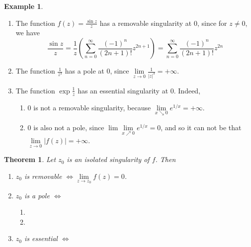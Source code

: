 \documentclass[12pt,openany]{book}
\newtheorem{theorem}{Theorem}[chapter]
\theoremstyle{definition}
\newtheorem{example}{Example}[section]
\newcommand{\of}[1]{\left( #1 \right)}
\newcommand{\abs}[1]{\left\lvert #1 \right\rvert}
\begin{document}
	\begin{example}
		\ \begin{enumerate}[(1)]
			\item The function $f(z)=\displaystyle\frac{\sin z}{z}$ has a removable singularity at $0$, since for $z\neq 0$, we have \[
			\frac{\sin z}{z}=\frac{1}{z}\of{\sum_{n=0}^\infty\frac{(-1)^n}{(2n+1)!}z^{2n+1}}=\sum_{n=0}^\infty\frac{(-1)^n}{(2n+1)!}z^{2n}
			\]
			\item The function $\displaystyle\frac{1}{z^3}$ has a pole at $0$, since $\displaystyle\lim\limits_{z\to 0}\frac{1}{\abs{z}^3}=+\infty$.
			\item The function $\exp\displaystyle\frac{1}{z}$ has an essential singularity at $0$. Indeed, \begin{enumerate}
				\item $0$ is not a removable singularity, because $\lim\limits_{x\searrow 0}e^{1/x}=+\infty$.
				\item $0$ is also not a pole, since $\lim\lim\limits_{x\nearrow 0}e^{1/x}=0$, and so it can not be that $\lim\limits_{z\to 0}\abs{f(z)}=+\infty$.
			\end{enumerate}
		\end{enumerate}
	\end{example}
	\vspace{8pt}
	\begin{tcolorbox}[colback=white,colframe=thmcolor,arc=5pt,title={\color{white}\bf Classification of Singularities via Limits}]
		\begin{theorem}
			Let $z_0$ is an isolated singularity of $f$. Then \begin{enumerate}[(1)]
				\item $z_0$ is removable $\iff\lim\limits_{z\to z_0}f(z)=0$.
				\item $z_0$ is a pole $\iff$ \begin{enumerate}
					\item 
					\item 
				\end{enumerate}
				\item $z_0$ is essential $\iff$
			\end{enumerate}
		\end{theorem}
	\end{tcolorbox}
	\vspace{4pt}
	
\end{document}
